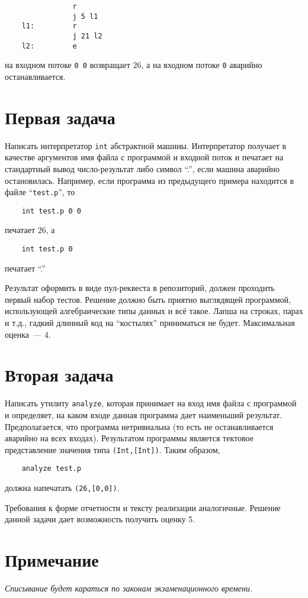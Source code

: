 \documentclass{article}
\begin{document}
\begin{verbatim}
                r
                j 5 l1
    l1:         r
                j 21 l2
    l2:         e
\end{verbatim}

\noindent на входном потоке \verb|0 0| возвращает $26$, а на входном потоке \verb|0| аварийно останавливается.

\section*{Первая задача}

Написать интерпретатор \verb|int| абстрактной машины. Интерпретатор получает в качестве аргументов имя файла 
с программой и входной поток и печатает на стандартный вывод число-результат либо символ ``.'', если машина
аварийно остановилась. Например, если программа из предыдущего примера находится в файле ``\verb|test.p|'', 
то

\begin{verbatim}
    int test.p 0 0
\end{verbatim}

\noindent печатает $26$, а

\begin{verbatim}
    int test.p 0 
\end{verbatim}

\noindent печатает ``.''

Результат оформить в виде пул-реквеста в репозиторий, должен проходить первый набор тестов. Решение должно быть
приятно выглядящей программой, использующей алгебраические типы данных и всё такое. Лапша на строках, парах и т.д., 
гадкий длинный код на ``костылях'' приниматься не будет. Максимальная оценка~--- 4.

\section*{Вторая задача}

Написать утилиту \verb|analyze|, которая принимает на вход имя файла с программой и определяет, на каком входе
данная программа дает наименьший результат. Предполагается, что программа нетривиальна (то есть не останавливается
аварийно на всех входах). Результатом программы является тектовое представление значения типа \verb|(Int,[Int])|.
Таким образом,

\begin{verbatim}
    analyze test.p
\end{verbatim}

\noindent должна напечатать \verb|(26,[0,0])|.

Требования к форме отчетности и тексту реализации аналогичные. Решение данной задачи дает возможность получить оценку 5.

\section*{Примечание}

\emph{Списывание будет караться по законам экзаменационного времени.}
\end{document}
